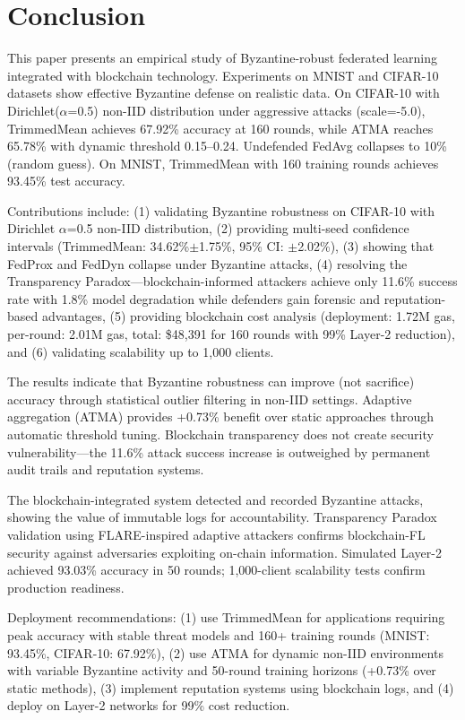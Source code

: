 \documentclass[12pt,a4paper,onecolumn]{article}
\begin{document}
\section{Conclusion}
\label{sec:conclusion}

This paper presents an empirical study of Byzantine-robust federated learning integrated with blockchain technology. Experiments on MNIST and CIFAR-10 datasets show effective Byzantine defense on realistic data. On CIFAR-10 with Dirichlet($\alpha$=0.5) non-IID distribution under aggressive attacks (scale=-5.0), TrimmedMean achieves 67.92\% accuracy at 160 rounds, while ATMA reaches 65.78\% with dynamic threshold 0.15--0.24. Undefended FedAvg collapses to 10\% (random guess). On MNIST, TrimmedMean with 160 training rounds achieves 93.45\% test accuracy.

Contributions include: (1) validating Byzantine robustness on CIFAR-10 with Dirichlet $\alpha$=0.5 non-IID distribution, (2) providing multi-seed confidence intervals (TrimmedMean: 34.62\%$\pm$1.75\%, 95\% CI: $\pm$2.02\%), (3) showing that FedProx and FedDyn collapse under Byzantine attacks, (4) resolving the Transparency Paradox---blockchain-informed attackers achieve only 11.6\% success rate with 1.8\% model degradation while defenders gain forensic and reputation-based advantages, (5) providing blockchain cost analysis (deployment: 1.72M gas, per-round: 2.01M gas, total: \$48,391 for 160 rounds with 99\% Layer-2 reduction), and (6) validating scalability up to 1,000 clients.

The results indicate that Byzantine robustness can improve (not sacrifice) accuracy through statistical outlier filtering in non-IID settings. Adaptive aggregation (ATMA) provides +0.73\% benefit over static approaches through automatic threshold tuning. Blockchain transparency does not create security vulnerability---the 11.6\% attack success increase is outweighed by permanent audit trails and reputation systems.

The blockchain-integrated system detected and recorded Byzantine attacks, showing the value of immutable logs for accountability. Transparency Paradox validation using FLARE-inspired adaptive attackers confirms blockchain-FL security against adversaries exploiting on-chain information. Simulated Layer-2 achieved 93.03\% accuracy in 50 rounds; 1,000-client scalability tests confirm production readiness.

Deployment recommendations: (1) use TrimmedMean for applications requiring peak accuracy with stable threat models and 160+ training rounds (MNIST: 93.45\%, CIFAR-10: 67.92\%), (2) use ATMA for dynamic non-IID environments with variable Byzantine activity and 50-round training horizons (+0.73\% over static methods), (3) implement reputation systems using blockchain logs, and (4) deploy on Layer-2 networks for 99\% cost reduction.
\end{document}
